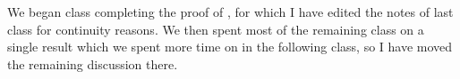 \documentclass[../notes.tex]{subfiles}
\begin{document}
We began class completing the proof of , for which I have edited the notes of last class for continuity reasons. We then spent most of the remaining class on a single result which we spent more time on in the following class, so I have moved the remaining discussion there.
\end{document}
